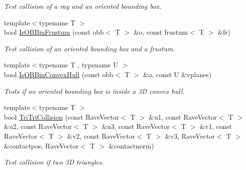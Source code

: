 \begin{DoxyCompactItemize}
\begin{DoxyCompactList}\small\item\em Test collision of a ray and an oriented bounding box. \item\end{DoxyCompactList}\item 
\hypertarget{group__geometric__primitives_gadda8d6c416e9ccfdbaf22e6755929e7e}{
{\footnotesize template$<$typename T $>$ }\\bool \hyperlink{group__geometric__primitives_gadda8d6c416e9ccfdbaf22e6755929e7e}{IsOBBinFrustum} (const obb$<$ T $>$ \&o, const frustum$<$ T $>$ \&fr)}
\label{group__geometric__primitives_gadda8d6c416e9ccfdbaf22e6755929e7e}

\begin{DoxyCompactList}\small\item\em Test collision of an oriented bounding box and a frustum. \item\end{DoxyCompactList}\item 
{\footnotesize template$<$typename T , typename U $>$ }\\bool \hyperlink{group__geometric__primitives_ga0d29be0998203e5a7b521ccb728533f6}{IsOBBinConvexHull} (const obb$<$ T $>$ \&o, const U \&vplanes)
\begin{DoxyCompactList}\small\item\em Tests if an oriented bounding box is inside a 3D convex hull. \item\end{DoxyCompactList}\item 
{\footnotesize template$<$typename T $>$ }\\bool \hyperlink{group__geometric__primitives_ga07425830ea25e001f8682da7f2504875}{TriTriCollision} (const RaveVector$<$ T $>$ \&u1, const RaveVector$<$ T $>$ \&u2, const RaveVector$<$ T $>$ \&u3, const RaveVector$<$ T $>$ \&v1, const RaveVector$<$ T $>$ \&v2, const RaveVector$<$ T $>$ \&v3, RaveVector$<$ T $>$ \&contactpos, RaveVector$<$ T $>$ \&contactnorm)
\begin{DoxyCompactList}\small\item\em Test collision if two 3D triangles.


\end{DoxyCompactList}
\end{DoxyCompactItemize}
